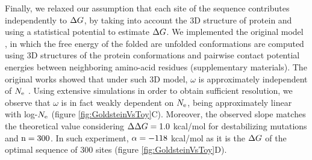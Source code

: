 \documentclass{MBE}%
\begin{document}
Finally, we relaxed our assumption that each site of the sequence contributes independently to $\Delta G$, by taking into account the $3$D structure of protein and using a statistical potential to estimate $\Delta G$.
We implemented the original model \citep{Williams2006, Goldstein2011, Pollock2012}, in which the free energy of the folded are unfolded conformations are computed using $3$D structures of the protein conformations and pairwise contact potential energies between neighboring amino-acid residues \citep{Miyazawa1985} (supplementary materials).
The original works showed that under such $3$D model, $\omega$ is approximately independent of $N_{\mathrm{e}}$ \citep{Goldstein2013}.
Using extensive simulations in order to obtain sufficient resolution, we observe that $\omega$ is in fact weakly dependent on $N_{\mathrm{e}}$, being approximately linear with log-$N_{\mathrm{e}}$ (figure \ref{fig:GoldsteinVsToy}C).
Moreover, the observed slope matches the theoretical value considering $\Delta \Delta G = 1.0$ kcal/mol for destabilizing mutations and $\text{n}=300$. 
In such experiment, $\alpha=-118$ kcal/mol as it is the $\Delta G$ of the optimal sequence of $300$ sites \citep{Goldstein2011} (figure \ref{fig:GoldsteinVsToy}D).
\end{document}
